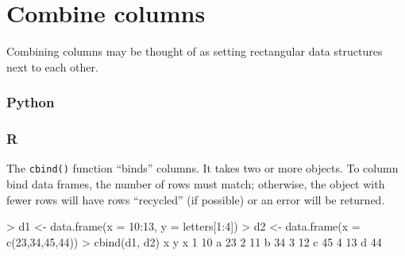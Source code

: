 \documentclass[
]{book}
\newenvironment{Shaded}{\begin{snugshade}}{\end{snugshade}}
\newcommand{\AttributeTok}[1]{\textcolor[rgb]{0.77,0.63,0.00}{#1}}
\newcommand{\DecValTok}[1]{\textcolor[rgb]{0.00,0.00,0.81}{#1}}
\newcommand{\FunctionTok}[1]{\textcolor[rgb]{0.00,0.00,0.00}{#1}}
\newcommand{\NormalTok}[1]{#1}
\newcommand{\OtherTok}[1]{\textcolor[rgb]{0.56,0.35,0.01}{#1}}
\newcommand{\SpecialCharTok}[1]{\textcolor[rgb]{0.00,0.00,0.00}{#1}}
\begin{document}
\hypertarget{combine-columns}{%
\section{Combine columns}\label{combine-columns}}

Combining columns may be thought of as setting rectangular data structures next to each other.

\hypertarget{python-28}{%
\subsubsection*{Python}\label{python-28}}

\hypertarget{r-28}{%
\subsubsection*{R}\label{r-28}}

The \texttt{cbind()} function ``binds'' columns. It takes two or more objects. To column bind data frames, the number of rows must match; otherwise, the object with fewer rows will have rows ``recycled'' (if possible) or an error will be returned.

\begin{Shaded}
\begin{Highlighting}[]
\SpecialCharTok{\textgreater{}}\NormalTok{ d1 }\OtherTok{\textless{}{-}} \FunctionTok{data.frame}\NormalTok{(}\AttributeTok{x =} \DecValTok{10}\SpecialCharTok{:}\DecValTok{13}\NormalTok{, }\AttributeTok{y =}\NormalTok{ letters[}\DecValTok{1}\SpecialCharTok{:}\DecValTok{4}\NormalTok{])}
\SpecialCharTok{\textgreater{}}\NormalTok{ d2 }\OtherTok{\textless{}{-}} \FunctionTok{data.frame}\NormalTok{(}\AttributeTok{x =} \FunctionTok{c}\NormalTok{(}\DecValTok{23}\NormalTok{,}\DecValTok{34}\NormalTok{,}\DecValTok{45}\NormalTok{,}\DecValTok{44}\NormalTok{))}
\SpecialCharTok{\textgreater{}} \FunctionTok{cbind}\NormalTok{(d1, d2)}
\NormalTok{   x y  x}
\DecValTok{1} \DecValTok{10}\NormalTok{ a }\DecValTok{23}
\DecValTok{2} \DecValTok{11}\NormalTok{ b }\DecValTok{34}
\DecValTok{3} \DecValTok{12}\NormalTok{ c }\DecValTok{45}
\DecValTok{4} \DecValTok{13}\NormalTok{ d }\DecValTok{44}
\end{Highlighting}
\end{Shaded}
\end{document}
